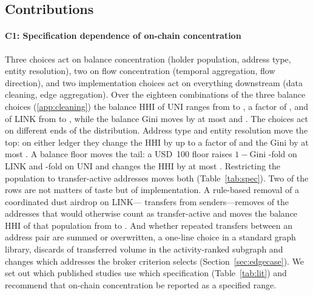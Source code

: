 \subsection{Contributions}

\paragraph{C1: Specification dependence of on-chain concentration}
Three choices act on balance concentration (holder population, address
type, entity resolution), two on flow concentration (temporal aggregation,
flow direction), and two implementation choices act on everything
downstream (data cleaning, edge aggregation). Over the eighteen
combinations of the three balance choices (\ref{app:cleaning}) the
balance HHI of UNI ranges from  to
, a factor of , and of
LINK from  to , while the
balance Gini moves by at most  and
. The choices act on different ends of the
distribution. Address type and entity resolution move the top: on either
ledger they change the HHI by up to a factor of  and the
Gini by at most . A balance floor moves the tail: a USD~100
floor raises $1-\mathrm{Gini}$ -fold on LINK and
-fold on UNI and changes the HHI by at most
. Restricting the population to transfer-active
addresses moves both (Table~\ref{tab:spec}). Two of the rows
are not matters of taste but of implementation. A rule-based removal of a
coordinated dust airdrop on LINK--- transfers from
 senders---removes  of the
addresses that would otherwise count as transfer-active and moves the
balance HHI of that population from  to
. And whether repeated transfers between an address pair
are summed or overwritten, a one-line choice in a standard graph library,
discards  of transferred volume in the activity-ranked
subgraph and changes which addresses the
broker criterion selects (Section~\ref{sec:edgecase}). We set out
which published studies use which specification
(Table~\ref{tab:lit}) and recommend that on-chain concentration be reported
as a specified range.

